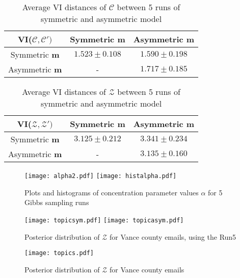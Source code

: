 \documentclass[a4paper]{article}
\begin{document}
\begin{table}[ht]
	\centering
	\begin{tabular}{|c|c|c|} 
		\hline
		\textbf{VI($\mathcal{C}, \mathcal{C'})$}& Symmetric \textbf{$\boldsymbol{m}$} &Asymmetric \textbf{ $\boldsymbol{m}$} \\
		\hline
		Symmetric \textbf{$\boldsymbol{m}$} &  $1.523\pm 0.108$&  $1.590\pm 0.198$\\
		\hline
		Asymmetric \textbf{$\boldsymbol{m}$} & - & $1.717 \pm 0.185$\\
		\hline
	\end{tabular}
	\caption {Average VI distances of $\mathcal{C}$ between 5 runs of symmetric and asymmetric model }
	\label{table:VIforC}
\end{table}
\begin{table}[ht]
	\centering
	\begin{tabular}{|c|c|c|} 
		\hline
		 \textbf{VI($\mathcal{Z}, \mathcal{Z'})$}& Symmetric \textbf{$\boldsymbol{m}$} &Asymmetric \textbf{ $\boldsymbol{m}$} \\
		\hline
		Symmetric \textbf{$\boldsymbol{m}$} &  $3.125\pm 0.212$&  $3.341\pm 0.234$\\
		\hline
		Asymmetric \textbf{$\boldsymbol{m}$} & - & $3.135 \pm 0.160$\\
		\hline
	\end{tabular}
	\caption {Average VI distances of $\mathcal{Z}$ between 5 runs of symmetric and asymmetric model}
	\label{table:VIforZ}
\end{table}
\normalsize
\begin{figure}[ht]
	\centering
	\texttt{[image: alpha2.pdf]} 
	\texttt{[image: histalpha.pdf]} 
	\caption{Plots and histograms of concentration parameter values $\alpha$ for 5 Gibbs sampling runs}
	\label{fig:alpha}
\end{figure}
\footnotesize
\begin{figure}[ht]
	\centering
	\texttt{[image: topicsym.pdf]} 
		\texttt{[image: topicasym.pdf]} 
	\caption{Posterior distribution of  $\mathcal{Z}$ for Vance county emails, using the Run5}
	\label{fig:topicsymasym}
\end{figure}
\begin{figure}[ht]
	\centering
		\texttt{[image: topics.pdf]} 
			\caption{Posterior distribution of  $\mathcal{Z}$ for Vance county emails}
			\label{fig:topics}
		\end{figure}
\footnotesize
\end{document}

